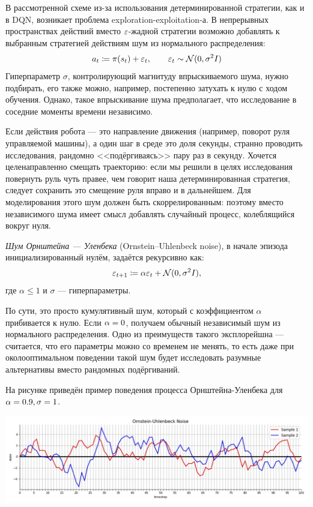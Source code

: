 В рассмотренной схеме из-за использования детерминированной стратегии, как и в DQN, возникает проблема exploration-exploitation-а. В непрерывных пространствах действий вместо $\varepsilon$-жадной стратегии возможно добавлять к выбранным стратегией действиям шум из нормального распределения:
$$a_t \coloneqq \pi(s_t) + \varepsilon_t, \qquad \varepsilon_t \sim \mathcal{N}(0, \sigma^2I)$$
Гиперпараметр $\sigma$, контролирующий магнитуду впрыскиваемого шума, нужно подбирать, его также можно, например, постепенно затухать к нулю с ходом обучения. Однако, такое впрыскивание шума предполагает, что исследование в соседние моменты времени независимо.

\begin{example}
Если действия робота --- это направление движения (например, поворот руля управляемой машины), а один шаг в среде это доля секунды, странно проводить исследования, рандомно <<подёргиваясь>> пару раз в секунду. Хочется целенаправленно смещать траекторию: если мы решили в целях исследования повернуть руль чуть правее, чем говорит наша детерминированная стратегия, следует сохранить это смещение руля вправо и в дальнейшем. Для моделирования этого шум должен быть скоррелированным: поэтому вместо независимого шума имеет смысл добавлять случайный процесс, колеблящийся вокруг нуля.
\end{example}

\begin{definition}
\emph{Шум Орнштейна — Уленбека} (Ornstein–Uhlenbeck noise), в начале эпизода инициализированный нулём, задаётся рекурсивно как:
$$\varepsilon_{t + 1} \coloneqq \alpha \varepsilon_t + \mathcal{N}(0, \sigma^2I),$$
где $\alpha \le 1$ и $\sigma$ --- гиперпараметры.
\end{definition}

По сути, это просто кумулятивный шум, который с коэффициентом $\alpha$ прибивается к нулю. Если $\alpha \HM= 0$, получаем обычный независимый шум из нормального распределения. Одно из преимуществ такого эксплорейшна --- считается, что его параметры можно со временем не менять, то есть даже при околооптимальном поведении такой шум будет исследовать разумные альтернативы вместо рандомных подёргиваний.

\begin{example}
На рисунке приведён пример поведения процесса Орнштейна-Уленбека для $\alpha \HM= 0.9, \sigma \HM= 1$.
\begin{center}
    \includegraphics[width=\textwidth]{Images/ornstein_uhlenbeck_noise.png}
\end{center}
\end{example}

